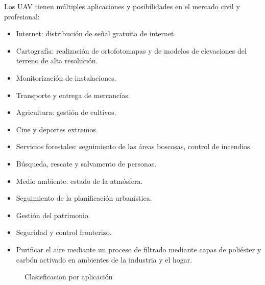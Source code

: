 Los UAV tienen múltiples aplicaciones y posibilidades en el mercado civil y profesional:
\begin{itemize}
\item Internet: distribución de señal gratuita de internet.
\item Cartografía: realización de ortofotomapas y de modelos de elevaciones del terreno de alta resolución.
\item Monitorización de instalaciones.
\item Transporte y entrega de mercancías.
\item Agricultura: gestión de cultivos.
\item Cine y deportes extremos.
\item Servicios forestales: seguimiento de las áreas boscosas, control de incendios.
\item Búsqueda, rescate y salvamento de personas.
\item Medio ambiente: estado de la atmósfera.
\item Seguimiento de la planificación urbanística.
\item Gestión del patrimonio.
\item Seguridad y control fronterizo.
\item Purificar el aire mediante un proceso de filtrado mediante capas de poliéster y carbón activado en ambientes de la industria y el hogar. 
\end{itemize}

\begin{figure}[H]
\centering
{}
\caption{Clasisficacion por aplicación}
\end{figure}

